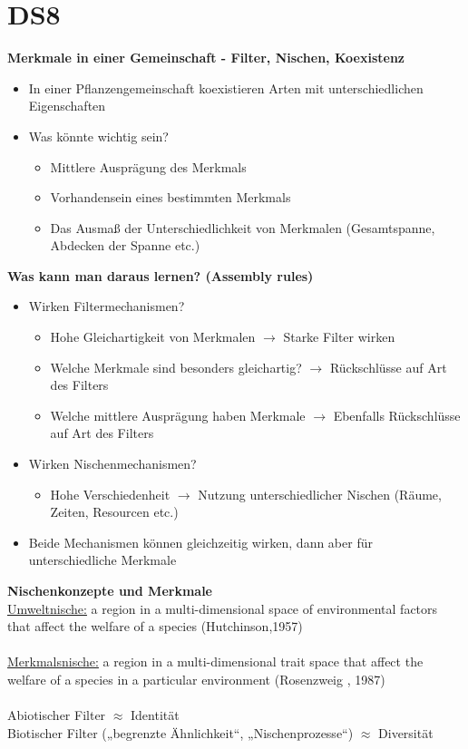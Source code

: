 \section{DS8}
\textbf{Merkmale in einer Gemeinschaft - Filter, Nischen, Koexistenz}
\begin{itemize}
	\item In einer Pflanzengemeinschaft koexistieren Arten mit unterschiedlichen Eigenschaften
	\item Was könnte wichtig sein?
	\begin{itemize}
		\item Mittlere Ausprägung des Merkmals
		\item Vorhandensein eines bestimmten Merkmals
		\item Das Ausmaß der Unterschiedlichkeit von Merkmalen (Gesamtspanne, Abdecken der Spanne etc.)
	\end{itemize}
\end{itemize}

\textbf{Was kann man daraus lernen? (Assembly rules)}
\begin{itemize}
	\item Wirken Filtermechanismen?
	\begin{itemize}
		\item Hohe Gleichartigkeit von Merkmalen $\rightarrow$ Starke Filter wirken
		\item Welche Merkmale sind besonders gleichartig? $\rightarrow$ Rückschlüsse auf Art des Filters
		\item Welche mittlere Ausprägung haben Merkmale $\rightarrow$ Ebenfalls Rückschlüsse auf Art des Filters
	\end{itemize}
	\item Wirken Nischenmechanismen?
	\begin{itemize}
		\item Hohe Verschiedenheit $\rightarrow$ Nutzung unterschiedlicher Nischen (Räume, Zeiten, Resourcen etc.)
	\end{itemize}
	\item Beide Mechanismen können gleichzeitig wirken, dann aber für unterschiedliche Merkmale
\end{itemize}

\textbf{Nischenkonzepte und Merkmale}\\
\underline{Umweltnische:} a region in a multi-dimensional space of environmental factors that affect the welfare of a species (Hutchinson,1957)\\\\
\underline{Merkmalsnische:} a region in a multi-dimensional trait space that affect the welfare of a species in a particular environment (Rosenzweig , 1987)
\\\\
Abiotischer Filter $\approx$ Identität\\
Biotischer Filter („begrenzte Ähnlichkeit“, „Nischenprozesse“) $\approx$ Diversität\\

